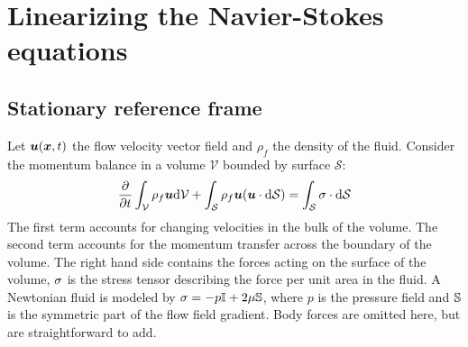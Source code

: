 \documentclass[thesis.tex]{subfiles}
\begin{document}
\chapter{Linearizing the Navier-Stokes equations}

\section{Stationary reference frame}

Let $\mbox{\boldmath$u$}(\mbox{\boldmath$x$}, t)$ the flow velocity vector field and $\rho_f$ the density of the fluid. Consider the momentum balance in a volume $\mathcal V$ bounded by surface $\mathcal S$:
\begin{align}
    \frac{\partial }{\partial t}\int_\mathcal V  \rho_f \mbox{\boldmath$u$} \mathrm{d}\mathcal V +
    \int_\mathcal S \rho_f\mbox{\boldmath$u$} (\mbox{\boldmath$u$} \cdot \mathrm{d} \mathcal S) =
    \int_\mathcal S \mathbb{\sigma} \cdot \mathrm{d} \mathcal S
\end{align}
The first term accounts for changing velocities in the bulk of the volume. The second term accounts for the momentum transfer across the boundary of the volume. The right hand side contains the forces acting on the surface of the volume, $\mathbb{\sigma}$ is the stress tensor describing the force per unit area in the fluid. A Newtonian fluid is modeled by $\mathbb{\sigma} = -p \mathbb{I} + 2\mu \mathbb{S}$, where $p$ is the pressure field and $\mathbb{S}$ is the symmetric part of the flow field gradient. Body forces are omitted here, but are straightforward to add.
\end{document}
